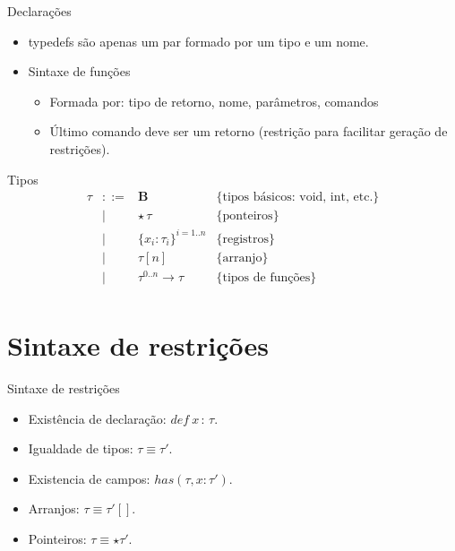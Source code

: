 \documentclass{beamer}
\begin{document}
   \begin{frame}{Declarações}
     \begin{itemize}
         \item typedefs são apenas um par formado por um tipo e um nome.
         \item Sintaxe de funções
         \begin{itemize}
             \item Formada por: tipo de retorno, nome, parâmetros, comandos
             \item Último comando deve ser um retorno (restrição para facilitar
               geração de restrições).
         \end{itemize}
     \end{itemize}
   \end{frame}
   \begin{frame}{Tipos}
     \[
\begin{array}{lcll}
	\tau & ::= & \textbf{B} & \{\text{tipos básicos: void, int,
	etc.}\}\\
	& \mid & \star\, \tau & \{\text{ponteiros}\} \\
	& \mid & \{x_i : \tau_i\}^{i=1..n} & \{\text{registros}\} \\
	& \mid & \tau[n] & \{\text{arranjo}\}\\
        & \mid & \tau^{0..n} \to\tau & \{\text{tipos de funções}\}\\
\end{array}
     \]
   \end{frame}
   \section{Sintaxe de restrições}
   \begin{frame}{Sintaxe de restrições}
       \begin{itemize}
           \item Existência de declaração: $def\:x\,:\,\tau$.
           \item Igualdade de tipos: $\tau \equiv \tau'$.
	   \item Existencia de campos: $has(\tau,x:\tau')$.
	   \item Arranjos: $\tau \equiv\tau'[]$.
	   \item Pointeiros: $\tau \equiv \star\tau'$.
       \end{itemize}
   \end{frame}
\end{document}
